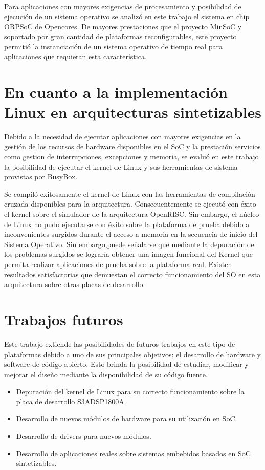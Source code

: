 Para aplicaciones con mayores exigencias de procesamiento y posibilidad de ejecución de un sistema operativo se analizó en este trabajo el sistema en
chip ORPSoC de Opencores. De mayores prestaciones que el proyecto MinSoC y soportado por gran cantidad de plataformas reconfigurables, este proyecto
permitió la instanciación de un sistema operativo de tiempo real para aplicaciones que requieran esta característica.
			
	\section{En cuanto a la implementación Linux en arquitecturas sintetizables} 

Debido a la necesidad de ejecutar aplicaciones con mayores exigencias en la gestión de los recursos de hardware disponibles en el SoC y la
prestación servicios como gestion de interrupciones, excepciones y memoria, se evaluó en este trabajo la posibilidad de ejecutar el kernel de Linux y
sus herramientas de sistema provistas por BusyBox. 

Se compiló exitosamente el kernel de Linux con las herramientas de compilación cruzada disponibles para la arquitectura. Consecuentemente se ejecutó
con éxito el kernel sobre el simulador de la arquitectura OpenRISC. Sin embargo, el núcleo de Linux no pudo ejecutarse con éxito sobre la plataforma
de prueba debido a inconvenientes surgidos durante el acceso a memoria en la secuencia de inicio del Sistema Operativo. Sin embargo,puede señalarse
que mediante la depuración de los problemas surgidos se lograría obtener una imagen funcional del Kernel que permita realizar aplicaciones de prueba
sobre la plataforma real. Existen resultados satisfactorias que demuestan el correcto funcionamiento del SO en esta arquitectura sobre otras
placas de desarrollo.
				
\section{Trabajos futuros}

Este trabajo extiende las posibilidades de futuros trabajos en este tipo de plataformas debido a uno de sus principales objetivos:
el desarrollo de hardware y software de código abierto. Esto brinda la posibilidad de estudiar, modificar y mejorar el diseño mediante la
disponibilidad de su código fuente.    

		\begin {itemize}
		  \item Depuración del kernel de Linux para su correcto funcionamiento sobre la placa de desarrollo S3ADSP1800A.
		  \item Desarrollo de nuevos módulos de hardware para su utilización en SoC.
		  \item Desarrollo de drivers para nuevos módulos.
		  \item Desarrollo de aplicaciones reales sobre sistemas embebidos basados en SoC sintetizables.
		\end{itemize}
								
	
	 